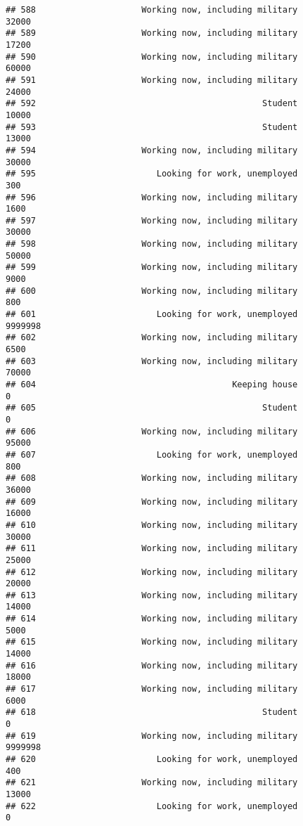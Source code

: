 \documentclass[]{book}
\theoremstyle{definition}
\theoremstyle{definition}
\theoremstyle{remark}
\begin{document}
\begin{verbatim}
## 588                     Working now, including military           32000
## 589                     Working now, including military           17200
## 590                     Working now, including military           60000
## 591                     Working now, including military           24000
## 592                                             Student           10000
## 593                                             Student           13000
## 594                     Working now, including military           30000
## 595                        Looking for work, unemployed             300
## 596                     Working now, including military            1600
## 597                     Working now, including military           30000
## 598                     Working now, including military           50000
## 599                     Working now, including military            9000
## 600                     Working now, including military             800
## 601                        Looking for work, unemployed         9999998
## 602                     Working now, including military            6500
## 603                     Working now, including military           70000
## 604                                       Keeping house               0
## 605                                             Student               0
## 606                     Working now, including military           95000
## 607                        Looking for work, unemployed             800
## 608                     Working now, including military           36000
## 609                     Working now, including military           16000
## 610                     Working now, including military           30000
## 611                     Working now, including military           25000
## 612                     Working now, including military           20000
## 613                     Working now, including military           14000
## 614                     Working now, including military            5000
## 615                     Working now, including military           14000
## 616                     Working now, including military           18000
## 617                     Working now, including military            6000
## 618                                             Student               0
## 619                     Working now, including military         9999998
## 620                        Looking for work, unemployed             400
## 621                     Working now, including military           13000
## 622                        Looking for work, unemployed               0

\end{verbatim}
\end{document}
